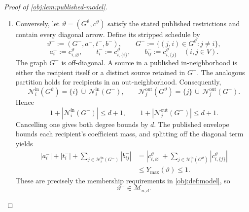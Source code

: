 \begin{proof}[Proof of \cref{obj:lem:published-model}]
\begin{enumerate}
Since \(G\) is off-diagonal,
\[
\mathcal N^{\mathrm{in}}_i(\widetilde G)
=\{i\}\,\dot\cup\,\mathcal N^{\mathrm{in}}_i(G),
\qquad
\mathcal N^{\mathrm{out}}_j(\widetilde G)
=\{j\}\,\dot\cup\,\mathcal N^{\mathrm{out}}_j(G).
\]
Splitting the coefficient sum at the own coordinate therefore gives
\[
|c^{\mathrm{pub}}_{i,\varnothing}|
+\sum_{j\in\mathcal N^{\mathrm{in}}_i(\widetilde G)}
|c^{\mathrm{pub}}_{i,\{j\}}|
=
|a_i|+|t_i|
+\sum_{j\in\mathcal N^{\mathrm{in}}_i(G)}|b_{ij}|.
\]
For \(\theta\in\mathcal M_{n,d}\), the coefficient-mass requirement in
\cref{obj:def:model} bounds each right-hand side by one. Taking the maximum proves
\[
Y_{\max}(\theta^+)\le1.
\]
The same disjoint neighborhood decompositions and the two degree bounds in
\cref{obj:def:model} give
\[
|\mathcal N^{\mathrm{in}}_i(\widetilde G)|
=1+|\mathcal N^{\mathrm{in}}_i(G)|\le d+1,
\qquad
|\mathcal N^{\mathrm{out}}_j(\widetilde G)|
=1+|\mathcal N^{\mathrm{out}}_j(G)|\le d+1.
\]
Every diagonal arrow belongs to \(\widetilde G\) by construction. These identities also cover \(d=0\), with empty off-diagonal neighborhoods and zero neighborhood sums.

\item Conversely, let \(\vartheta=(G^\vartheta,c^\vartheta)\) satisfy the stated published restrictions and contain every diagonal arrow. Define its stripped schedule by
\[
\vartheta^-:=(G^-,a^-,t^-,b^-),
\qquad
G^-:=\{(j,i)\in G^\vartheta:j\ne i\},
\]
\[
a_i^-:=c^\vartheta_{i,\varnothing},
\qquad
t_i^-:=c^\vartheta_{i,\{i\}},
\qquad
b_{ij}^-:=c^\vartheta_{i,\{j\}}
\quad(i,j\in V).
\]
The graph \(G^-\) is off-diagonal. A source in a published in-neighborhood is either the recipient itself or a distinct source retained in \(G^-\). The analogous partition holds for recipients in an out-neighborhood. Consequently,
\[
\mathcal N^{\mathrm{in}}_i(G^\vartheta)
=\{i\}\,\dot\cup\,\mathcal N^{\mathrm{in}}_i(G^-),
\qquad
\mathcal N^{\mathrm{out}}_j(G^\vartheta)
=\{j\}\,\dot\cup\,\mathcal N^{\mathrm{out}}_j(G^-).
\]
Hence
\[
1+|\mathcal N^{\mathrm{in}}_i(G^-)|\le d+1,
\qquad
1+|\mathcal N^{\mathrm{out}}_j(G^-)|\le d+1.
\]
Cancelling one gives both degree bounds by \(d\). The published envelope bounds each recipient's coefficient mass, and splitting off the diagonal term yields
\[
\begin{aligned}
|a_i^-|+|t_i^-|
+\sum_{j\in\mathcal N^{\mathrm{in}}_i(G^-)}|b_{ij}^-|
&=
|c^\vartheta_{i,\varnothing}|
+\sum_{j\in\mathcal N^{\mathrm{in}}_i(G^\vartheta)}
|c^\vartheta_{i,\{j\}}|\\
&\le Y_{\max}(\vartheta)\le1.
\end{aligned}
\]
These are precisely the membership requirements in \cref{obj:def:model}, so
\[
\vartheta^-\in\mathcal M_{n,d}.
\]


\end{enumerate}
\end{proof}
